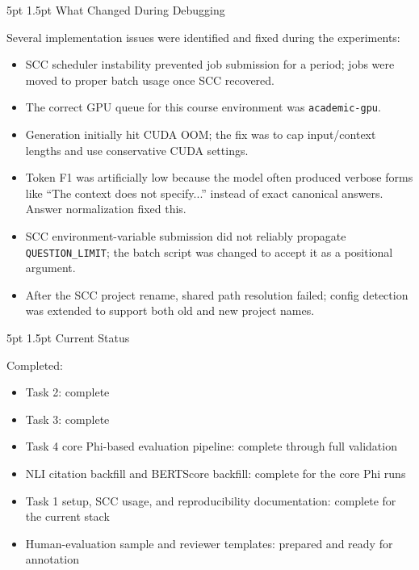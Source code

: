 \documentclass[11pt,letterpaper]{article}
\makeatletter
\renewcommand{\section}{\@startsection{section}{1}{\z@}%
  {5pt \@plus 1pt \@minus 1pt}{1.5pt}%
  {\normalfont\normalsize\bfseries}}
\makeatother
\begin{document}
\section{What Changed During Debugging}

Several implementation issues were identified and fixed during the experiments:

\begin{itemize}
\item SCC scheduler instability prevented job submission for a period; jobs were moved to proper batch usage once SCC recovered.
\item The correct GPU queue for this course environment was \texttt{academic-gpu}.
\item Generation initially hit CUDA OOM; the fix was to cap input/context lengths and use conservative CUDA settings.
\item Token F1 was artificially low because the model often produced verbose forms like ``The context does not specify...'' instead of exact canonical answers. Answer normalization fixed this.
\item SCC environment-variable submission did not reliably propagate \texttt{QUESTION\_LIMIT}; the batch script was changed to accept it as a positional argument.
\item After the SCC project rename, shared path resolution failed; config detection was extended to support both old and new project names.
\end{itemize}

\section{Current Status}

Completed:

\begin{itemize}
\item Task 2: complete
\item Task 3: complete
\item Task 4 core Phi-based evaluation pipeline: complete through full validation
\item NLI citation backfill and BERTScore backfill: complete for the core Phi runs
\item Task 1 setup, SCC usage, and reproducibility documentation: complete for the current stack
\item Human-evaluation sample and reviewer templates: prepared and ready for annotation
\end{itemize}
\end{document}
